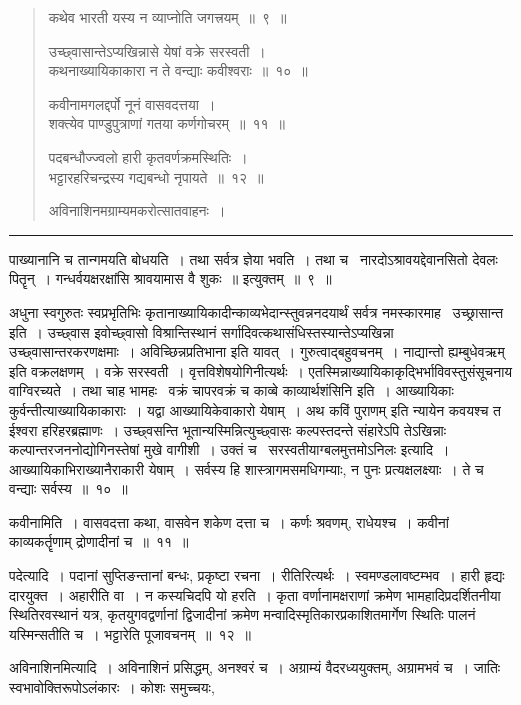 \documentclass[11pt, openany]{book}
\begin{document}
\newpage

\begin{quote}
{\ha कथेव भारती यस्य न व्याप्नोति जगत्त्रयम्~॥~९~॥

उच्छ्वासान्तेऽप्यखिन्नासे येषां वक्रे सरस्वती~।\\
कथनाख्यायिकाकारा न ते वन्द्याः कवीश्वराः~॥~१०~॥

कवीनामगलद्दर्पो नूनं वासवदत्तया~।\\
शक्त्येव पाण्डुपुत्राणां गतया कर्णगोचरम्~॥~११~॥

पदबन्धौज्ज्वलो हारी कृतवर्णक्रमस्थितिः~।\\
भट्टारहरिचन्द्रस्य गद्यबन्धो नृपायते~॥~१२~॥

अविनाशिनमग्राम्यमकरोत्सातवाहनः~।}
\end{quote}

\hrule

\noindent
{\s पाख्यानानि च तान्गमयति बोधयति~। तथा सर्वत्र ज्ञेया भवति~। तथा च \textendash\ नारदोऽश्रावयद्देवानसितो देवलः पितॄन्~। गन्धर्वयक्षरक्षांसि श्रावयामास वै शुकः~॥ इत्युक्तम्~॥~९~॥

अधुना स्वगुरुतः स्वप्रभृतिभिः कृतानाख्यायिकादीन्काव्यभेदान्स्तुवन्ननदयार्थं सर्वत्र नमस्कारमाह \textendash\ {\qtt उच्छ्रासान्त इति}~। उच्छ्वास इवोच्छ्वासो विश्रान्तिस्थानं सर्गादिवत्कथासंधिस्तस्यान्तेऽप्यखिन्ना उच्छ्वासान्तरकरणक्षमाः~। अविच्छिन्नप्रतिभाना इति यावत्~। गुरुत्वाद्बहुवचनम्~। {\qt नाद्यान्तो ह्यम्बुधेवऋम्} इति वक्रलक्षणम्~। वक्रे सरस्वती~। वृत्तविशेषयोगिनीत्यर्थः~। एतस्मिन्नाख्यायिकाकृद्भिर्भाविवस्तुसंसूचनाय वाग्विरच्यते~। तथा चाह भामहः \textendash\ {\qt वक्रं चापरवक्रं च काव्बे काव्यार्थशंसिनि} इति~। आख्यायिकाः कुर्वन्तीत्याख्यायिकाकाराः~। यद्वा आख्यायिकेवाकारो येषाम्~। अथ {\qt कविं पुराणम्} इति न्यायेन कवयश्च त ईश्वरा हरिहरब्रह्माणः~। उच्छ्वसन्ति भूतान्यस्मिन्नित्युच्छ्वासः कल्पस्तदन्ते संहारेऽपि तेऽखिन्नाः कल्पान्तरजननोद्योगिनस्तेषां मुखे वागीशी~। उक्तं च \textendash\ {\qt सरस्वतीयाग्बलमुत्तमोऽनिलः} इत्यादि~। आख्यायिकाभिराख्यानैराकारी येषाम्~। सर्वस्य हि शास्त्रागमसमधिगम्याः, न पुनः प्रत्यक्षलक्ष्याः~। ते च वन्द्याः सर्वस्य~॥~१०~॥

{\qtt कवीनामिति}~। वासवदत्ता कथा, वासवेन शकेण दत्ता च~। कर्णः श्रवणम्, राधेयश्च~। कवीनां काव्यकर्तॄणाम् द्रोणादीनां च~॥~११~॥

{\qtt पदेत्यादि}~। पदानां सुप्तिङन्तानां बन्धः, प्रकृष्टा रचना~। रीतिरित्यर्थः~। स्वमण्डलावष्टम्भव~। हारी हृद्यः दारयुक्त~। अहारीति वा~। न कस्यचिदपि यो हरति~। कृता वर्णानामक्षराणां क्रमेण भामहादिप्रदर्शितनीया स्थितिरवस्थानं यत्र, कृतयुगवद्वर्णानां द्विजादीनां क्रमेण मन्वादिस्मृतिकारप्रकाशितमार्गेण स्थितिः पालनं यस्मिन्सतीति च~। भट्टारेति पूजावचनम्~॥~१२~॥

{\qtt अविनाशिनमित्यादि}~। अविनाशिनं प्रसिद्धम्, अनश्वरं च~। अग्राम्यं वैदरध्ययुक्तम्, अग्रामभवं च~। जातिः स्वभावोक्तिरूपोऽलंकारः~। कोशः समुच्चयः,}
\end{document}
